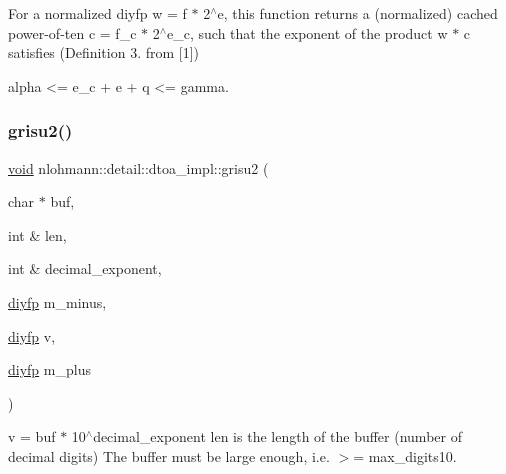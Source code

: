 For a normalized diyfp w = f $\ast$ 2$^\wedge$e, this function returns a (normalized) cached power-\/of-\/ten c = f\+\_\+c $\ast$ 2$^\wedge$e\+\_\+c, such that the exponent of the product w $\ast$ c satisfies (Definition 3. from \mbox{[}1\mbox{]}) \begin{DoxyVerb} alpha <= e_c + e + q <= gamma.
\end{DoxyVerb}
 \mbox{\label{namespacenlohmann_1_1detail_1_1dtoa__impl_a05b681dcb8569b9784c6dccfadb01633}} 
\subsubsection{\texorpdfstring{grisu2()}{grisu2()}\hspace{0.1cm}{\footnotesize\ttfamily [1/2]}}
{\footnotesize\ttfamily \mbox{\hyperlink{namespacenlohmann_1_1detail_a59fca69799f6b9e366710cb9043aa77d}{void}} nlohmann\+::detail\+::dtoa\+\_\+impl\+::grisu2 (\begin{DoxyParamCaption}\item[{char $\ast$}]{buf,  }\item[{int \&}]{len,  }\item[{int \&}]{decimal\+\_\+exponent,  }\item[{\mbox{\hyperlink{structnlohmann_1_1detail_1_1dtoa__impl_1_1diyfp}{diyfp}}}]{m\+\_\+minus,  }\item[{\mbox{\hyperlink{structnlohmann_1_1detail_1_1dtoa__impl_1_1diyfp}{diyfp}}}]{v,  }\item[{\mbox{\hyperlink{structnlohmann_1_1detail_1_1dtoa__impl_1_1diyfp}{diyfp}}}]{m\+\_\+plus }\end{DoxyParamCaption})\hspace{0.3cm}{\ttfamily [inline]}}

v = buf $\ast$ 10$^\wedge$decimal\+\_\+exponent len is the length of the buffer (number of decimal digits) The buffer must be large enough, i.\+e. $>$= max\+\_\+digits10. \mbox{\label{namespacenlohmann_1_1detail_1_1dtoa__impl_aab7a9670a4f4704a5d0347ad7588576b}} 
